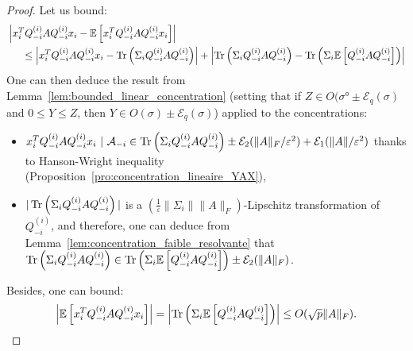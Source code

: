 \documentclass[a4papaer, titlepage]{book}
\begin{document}
\begin{proof}
  Let us bound:
  \begin{align*}
    &\left\vert x_i^TQ_{-i}^{(i)}AQ_{-i}^{(i)}x_i - \mathbb E \left[ x_i^TQ_{-i}^{(i)}AQ_{-i}^{(i)}x_i \right] \right\vert\\
    &\hspace{0.5cm} \leq \left\vert x_i^TQ_{-i}^{(i)}AQ_{-i}^{(i)}x_i -  \operatorname{Tr} \left( \Sigma_i Q_{-i}^{(i)}AQ_{-i}^{(i)} \right) \right\vert +\left\vert \operatorname{Tr} \left( \Sigma_i Q_{-i}^{(i)}AQ_{-i}^{(i)} \right) - \operatorname{Tr} \left( \Sigma_i \mathbb E \left[Q_{-i}^{(i)}AQ_{-i}^{(i)}\right] \right)  \right\vert
  \end{align*}
  One can then deduce the result from Lemma~\ref{lem:bounded_linear_concentration} (setting that if $Z \in O(\sigma° \pm \mathcal E_q(\sigma)$ and $0 \leq Y \leq Z$, then $Y \in O(\sigma) \pm \mathcal E_q(\sigma)$) applied to the concentrations:
  \begin{itemize}
    \item $ x_i^TQ_{-i}^{(i)}AQ_{-i}^{(i)}x_i \ | \ \mathcal A_{-i} \in  \operatorname{Tr} \left( \Sigma_i Q_{-i}^{(i)}AQ_{-i}^{(i)} \right) \pm \mathcal E_2(\|A\|_F/\varepsilon^2) + \mathcal E_1(\|A\|/\varepsilon^2)$ thanks to Hanson-Wright inequality (Proposition~\ref{pro:concentration_lineaire_YAX}),
    \item $|\operatorname{Tr} \left( \Sigma_i Q_{-i}^{(i)}AQ_{-i}^{(i)} \right)|$ is a $(\frac{1}{\varepsilon}\|\Sigma_i\|\|A\|_F)$-Lipschitz transformation of $Q_{-i}^{(i)}$, and therefore, one can deduce from Lemma~\ref{lem:concentration_faible_resolvante} that $ \operatorname{Tr} \left( \Sigma_i Q_{-i}^{(i)}AQ_{-i}^{(i)} \right) \in  \operatorname{Tr} \left( \Sigma_i \mathbb E \left[Q_{-i}^{(i)}AQ_{-i}^{(i)}\right] \right) \pm \mathcal E_2(\|A\|_F)$. 
  \end{itemize}
  Besides, one can bound:
  \begin{align*}
    \left\vert \mathbb E \left[ x_i^TQ_{-i}^{(i)}AQ_{-i}^{(i)}x_i \right] \right\vert = \left\vert \operatorname{Tr} \left(  \Sigma_i \mathbb E \left[ Q_{-i}^{(i)}AQ_{-i}^{(i)}  \right] \right) \right\vert \leq O(\sqrt p \|A\|_F).
  \end{align*}
\end{proof}
\end{document}
